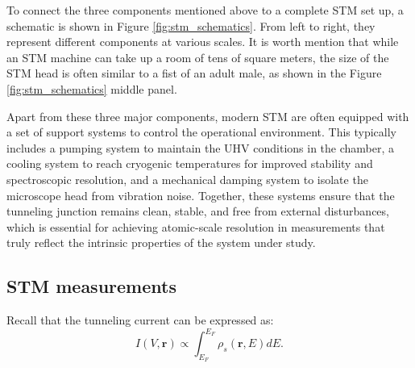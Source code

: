To connect the three components mentioned above to a complete \ac{STM} set up, a schematic is shown in Figure \ref{fig:stm_schematics}. From left to right, they represent different components at various scales. It is worth mention that while an \ac{STM} machine can take up a room of tens of square meters, the size of the \ac{STM} head is often similar to a fist of an adult male, as shown in the Figure \ref{fig:stm_schematics} middle panel.

Apart from these three major components, modern \ac{STM} are often equipped with a set of support systems to control the operational environment. This typically includes a pumping system to maintain the UHV conditions in the chamber, a cooling system to reach cryogenic temperatures for improved stability and spectroscopic resolution, and a mechanical damping system to isolate the microscope head from vibration noise. Together, these systems ensure that the tunneling junction remains clean, stable, and free from external disturbances, which is essential for achieving atomic-scale resolution in measurements that truly reflect the intrinsic properties of the system under study.  

\subsection{\ac{STM} measurements}

Recall that the tunneling current can be expressed as:  
\begin{equation}
	I(V,\mathbf{r}) \propto \int_{E_F}^{E_F}\rho_s(\mathbf{r},E)dE. 
\end{equation}

